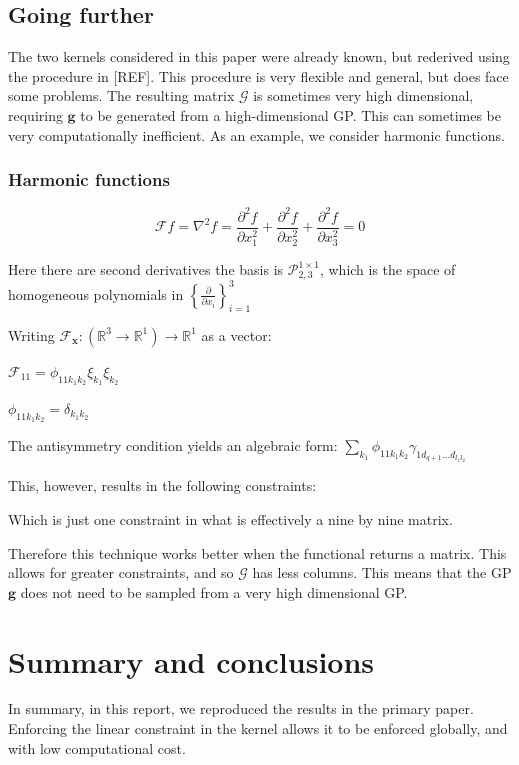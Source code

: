 \documentclass[12pt,a4paper,twoside]{report}
\theoremstyle{definition}
\begin{document}
\section{Going further}
The two kernels considered in this paper were already known, but rederived using the procedure in [REF]. This procedure is very flexible and general, but does face some problems. The resulting matrix $\mathscr G$ is sometimes very high dimensional, requiring $\mathbf g$ to be generated from a high-dimensional GP. This can sometimes be very computationally inefficient. As an example, we consider harmonic functions.

\subsection{Harmonic functions}
\begin{equation*}
	\mathscr F f = \nabla^2 f= \frac{\partial ^2f}{\partial x_1^2} + \frac{\partial ^2f}{\partial x_2^2}+\frac{\partial ^2f}{\partial x_3^2} =0
\end{equation*}

Here there are second derivatives the basis is $\mathcal P_{2,3}^{1\times 1}$, which is the space of homogeneous polynomials in $\left\{\frac{\partial}{\partial x_i}\right\}_{i=1}^3$

Writing $\mathscr F_\mathbf x:(\mathbb{R}^3\to\mathbb{R}^1)\to \mathbb{R}^1$ as a vector:

$\mathscr F_{11} = \phi_{11k_1k_2}\xi_{k_1}\xi_{k_2}$

$\phi_{11k_1k_2} = \delta_{k_1k_2}$

The antisymmetry condition yields an algebraic form:
$\sum_{k_1}\phi_{11k_1k_2} \gamma_{1d_{q+1}\dots d_{l_1l_2}}$

This, however, results in the following constraints:

Which is just one constraint in what is effectively a nine by nine matrix.

Therefore this technique works better when the functional returns a matrix. This allows for greater constraints, and so $\mathcal G$ has less columns. This means that the GP $\mathbf g$ does not need to be sampled from a very high dimensional GP.

\chapter{Summary and conclusions}

In summary, in this report, we reproduced the results in the primary paper. Enforcing the linear constraint in the kernel allows it to be enforced globally, and with low computational cost.
\end{document}
